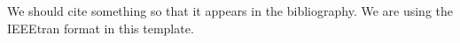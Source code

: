 
We should cite something \cite{sample:docs} so that it appears in the bibliography. We are using the IEEEtran format in this template.


\renewcommand{\bibname}{References}

\newpage


